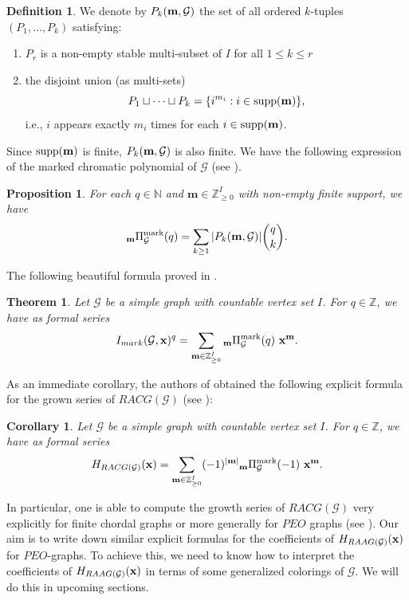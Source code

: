 \documentclass[11pt,reqno]{amsart}
\numberwithin{equation}{section} %
\newtheorem{thm}{Theorem}
\newtheorem{prop}{Proposition}
\newtheorem{cor}{Corollary}
\theoremstyle{definition}
\newtheorem{defn}{Definition}
\theoremstyle{remark}
\numberwithin{equation}{section}
\begin{document}
\begin{defn}
    We denote by $P_k(\bold{m},\mathcal{G})$ the set of all ordered $k$-tuples $(P_1,\dots,P_k)$ satisfying:
\begin{enumerate}
\item $P_r$ is a non-empty stable multi-subset of $I$ for all $1\leq k\leq r$ \medskip
    \item the disjoint union (as multi-sets) 
    $$P_1\sqcup \dots\sqcup P_k = \{i^{m_i} : i\in\mathrm{supp}(\bold{m})\},$$ i.e., $i$ appears exactly $m_i$ times for each $i\in \mathrm{supp}(\bold{m})$.
\end{enumerate} \end{defn} Since $\mathrm{supp}(\bold{m})$ is finite, $P_k(\bold{m},\mathcal{G})$ is also finite.
We have the following expression of the marked chromatic polynomial of $\mathcal{G}$ (see \cite[Proposition 3.1]{CDV}).
\begin{prop}\label{props6}
For each $q\in \mathbb{N}$ and $\mathbf{m}\in\mathbb{Z}_{\ge 0}^I$ with non-empty finite support, we have
    \begin{equation}
    \label{equation1}
    _{\bold{m}}\Pi^{\mathrm{mark}}_\mathcal{G}(q)=\sum_{k\geq 1}| P_k(\mathbf{m},\mathcal{G})| \binom{q}{k}.
\end{equation} \end{prop}
The following beautiful formula proved in \cite[Theorem 1]{CDV}.
\begin{thm}\label{expmarkedindp}
    Let $\mathcal{G}$ be a simple graph with countable vertex set $I$. For $q\in \mathbb{Z}$, we have as formal series
    $$I_{mark}(\mathcal{G},\mathbf{x})^q=\sum_{\mathbf{m}\in \mathbb{Z}_{\ge 0}^{I}} {_{\bold{m}}\Pi^{\mathrm{mark}}_\mathcal{G}(q)}\ \bold x^\mathbf{m}.$$
\end{thm} 
As an immediate corollary, the authors of \cite{CDV} obtained the following explicit formula for the grown series of $RACG(\mathcal{G})$  (see \cite[Theorem 4]{CDV}):
\begin{cor}\label{corracg}   Let $\mathcal{G}$ be a simple graph with countable vertex set $I$. For $q\in \mathbb{Z}$, we have as formal series
 $$H_{RACG(\mathcal{G})}(\bold x) = \sum_{\mathbf{m}\in \mathbb{Z}_{\ge 0}^{I}} (-1)^{|\bold m|} {_{\bold{m}}\Pi^{\mathrm{mark}}_\mathcal{G}(-1)}\ \bold x^\mathbf{m}.$$
\end{cor}

In particular, one is able to compute the growth series of $RACG(\mathcal{G})$ very explicitly for finite chordal graphs or more generally for $PEO$ graphs (see \cite[Corollary 6.3]{CDV}). %
Our aim is to write down similar explicit formulas for the coefficients of $H_{RAAG(\mathcal{G})}(\bold x)$ for $PEO$-graphs. To achieve this, we need to know how to interpret 
 the coefficients of $H_{RAAG(\mathcal{G})}(\bold x)$ in terms of some generalized colorings of $\mathcal G.$ We will do this in upcoming sections. 
\end{document}
